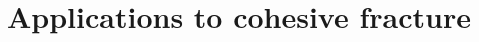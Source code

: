 \section{Applications to cohesive fracture}

\sectioncover

\subsection{}

\begin{frame}
\end{frame}
